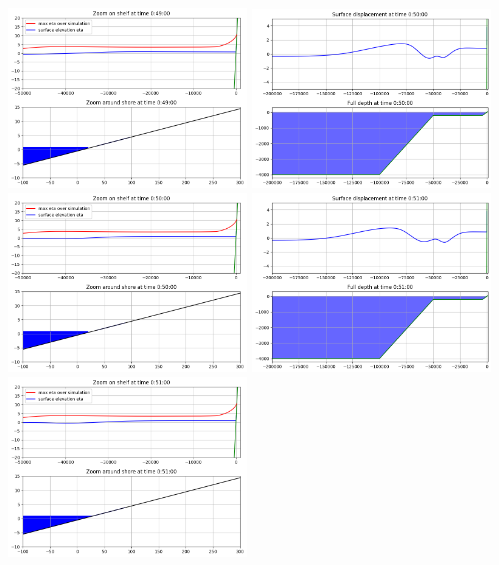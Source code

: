 \documentclass[11pt]{article}
\begin{document}
\includegraphics[width=0.475\textwidth]{frame0049fig1.png}
\vskip 10pt 
\includegraphics[width=0.475\textwidth]{frame0050fig0.png}
\includegraphics[width=0.475\textwidth]{frame0050fig1.png}
\vskip 10pt 
\includegraphics[width=0.475\textwidth]{frame0051fig0.png}
\includegraphics[width=0.475\textwidth]{frame0051fig1.png}
\end{document}
